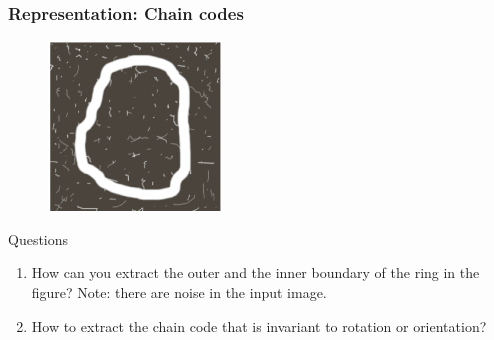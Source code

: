 \documentclass[english,11pt,table,handout]{beamer}
\begin{document}
\frame
{
	\frametitle{Representation: Chain codes}
	\begin{figure}[!h]
		\includegraphics[height=4.5cm]{chaincode_3.png}
	\end{figure}
	
	\begin{block}{Questions}
		\begin{enumerate}
			\item How can you extract the outer and the inner boundary of the ring in the figure? Note: there are noise in the input image.
			\item How to extract the chain code that is invariant to rotation or orientation?
			
		\end{enumerate}
	\end{block}
}
\end{document}
